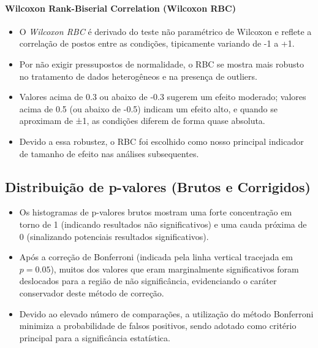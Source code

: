 \paragraph{Wilcoxon Rank-Biserial Correlation (Wilcoxon RBC)}
\begin{itemize}
    \item O \emph{Wilcoxon RBC} é derivado do teste não paramétrico de Wilcoxon e reflete a correlação de postos entre as condições, tipicamente variando de -1 a +1.
    \item Por não exigir pressupostos de normalidade, o RBC se mostra mais robusto no tratamento de dados heterogêneos e na presença de outliers.
    \item Valores acima de 0.3 ou abaixo de -0.3 sugerem um efeito moderado; valores acima de 0.5 (ou abaixo de -0.5) indicam um efeito alto, e quando se aproximam de ±1, as condições diferem de forma quase absoluta.
    \item Devido a essa robustez, o RBC foi escolhido como nosso principal indicador de tamanho de efeito nas análises subsequentes.
\end{itemize}

\subsection{Distribuição de p-valores (Brutos e Corrigidos)}
\begin{itemize}
    \item Os histogramas de p-valores brutos mostram uma forte concentração em torno de 1 (indicando resultados não significativos) e uma cauda próxima de 0 (sinalizando potenciais resultados significativos).
    \item Após a correção de Bonferroni (indicada pela linha vertical tracejada em \(p=0.05\)), muitos dos valores que eram marginalmente significativos foram deslocados para a região de não significância, evidenciando o caráter conservador deste método de correção.
    \item Devido ao elevado número de comparações, a utilização do método Bonferroni minimiza a probabilidade de falsos positivos, sendo adotado como critério principal para a significância estatística.
\end{itemize}

